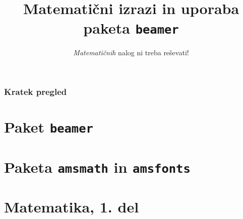 \documentclass{beamer}
\begin{document}

\title{Matematični izrazi in uporaba paketa \texttt{beamer}}
\subtitle{\emph{Matematičnih} nalog ni treba reševati!}
\date{}

\begin{frame}
    \titlepage    
\end{frame}

\begin{frame}
    \frametitle{Kratek pregled}
    \tableofcontents %
\end{frame}

\section{Paket \texttt{beamer}}


\section{Paketa \texttt{amsmath} in \texttt{amsfonts}}


\section[Matematika, 1. del\\\large{Analiza, logika, množice}]{Matematika, 1. del}

\end{document}

